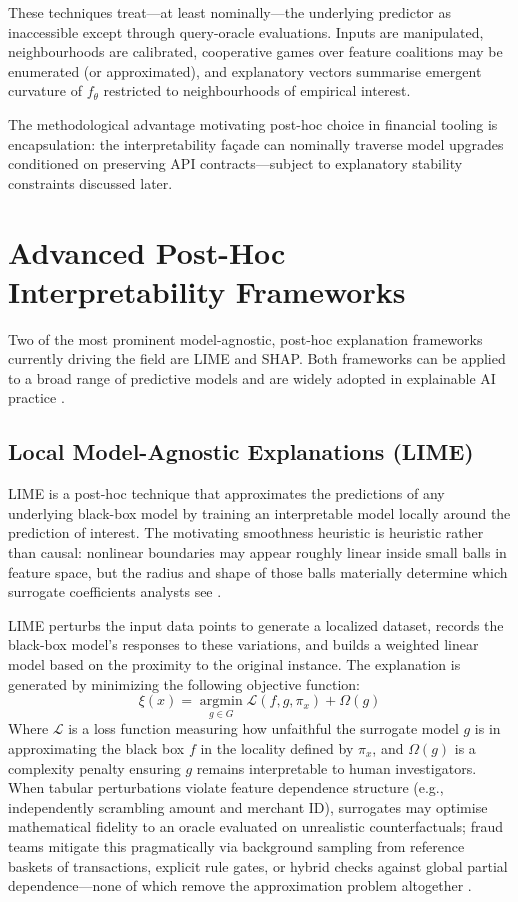 These techniques treat---at least nominally---the underlying predictor as inaccessible except through query-oracle evaluations. Inputs are manipulated, neighbourhoods are calibrated, cooperative games over feature coalitions may be enumerated (or approximated), and explanatory vectors summarise emergent curvature of $f_\theta$ restricted to neighbourhoods of empirical interest.

The methodological advantage motivating post-hoc choice in financial tooling is encapsulation: the interpretability façade can nominally traverse model upgrades conditioned on preserving API contracts---subject to explanatory stability constraints discussed later.

\section{Advanced Post-Hoc Interpretability Frameworks}
Two of the most prominent model-agnostic, post-hoc explanation frameworks currently driving the field are LIME and SHAP. Both frameworks can be applied to a broad range of predictive models and are widely adopted in explainable AI practice \cite{lime_original,shap_original,xai_survey}.

\subsection{Local Model-Agnostic Explanations (LIME)}
LIME is a post-hoc technique that approximates the predictions of any underlying black-box model by training an interpretable model locally around the prediction of interest. The motivating smoothness heuristic is heuristic rather than causal: nonlinear boundaries may appear roughly linear inside small balls in feature space, but the radius and shape of those balls materially determine which surrogate coefficients analysts see \cite{lime_original,guidotti_blackbox_survey2018}.

LIME perturbs the input data points to generate a localized dataset, records the black-box model's responses to these variations, and builds a weighted linear model based on the proximity to the original instance. The explanation is generated by minimizing the following objective function:
\begin{equation}
\xi(x) = \underset{g \in G}{\operatorname{argmin}} \mathcal{L}(f, g, \pi_x) + \Omega(g)
\end{equation}
Where $\mathcal{L}$ is a loss function measuring how unfaithful the surrogate model $g$ is in approximating the black box $f$ in the locality defined by $\pi_x$, and $\Omega(g)$ is a complexity penalty ensuring $g$ remains interpretable to human investigators. When tabular perturbations violate feature dependence structure (e.g., independently scrambling amount and merchant ID), surrogates may optimise mathematical fidelity to an oracle evaluated on unrealistic counterfactuals; fraud teams mitigate this pragmatically via background sampling from reference baskets of transactions, explicit rule gates, or hybrid checks against global partial dependence—none of which remove the approximation problem altogether \cite{lime_original,guidotti_blackbox_survey2018}.

